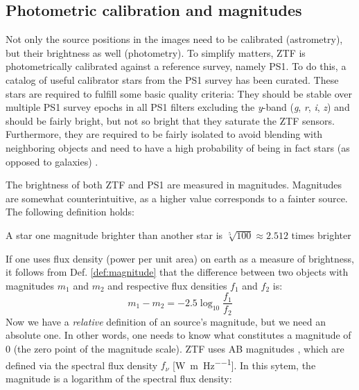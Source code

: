 \subsection{Photometric calibration and magnitudes}
Not only the source positions in the images need to be calibrated (astrometry), but their brightness as well (photometry). To simplify matters, ZTF is photometrically calibrated against a reference survey, namely PS1. To do this, a catalog of useful calibrator stars from the PS1 survey has been curated. These stars are required to fulfill some basic quality criteria: They should be stable over multiple PS1 survey epochs in all PS1 filters excluding the \textit{y}-band (\textit{g}, \textit{r}, \textit{i}, \textit{z}) and should be fairly bright, but not so bright that they saturate the ZTF sensors. Furthermore, they are required to be fairly isolated to avoid blending with neighboring objects and need to have a high probability of being in fact stars (as opposed to galaxies) \cite{Masci2019a}.

The brightness of both ZTF and PS1 are measured in magnitudes. Magnitudes are somewhat counterintuitive, as a higher value corresponds to a fainter source. The following definition holds:

\begin{definition}
A star one magnitude brighter than another star is $\sqrt[5]{100} \approx 2.512$ times brighter
\end{definition}
If one uses flux density (power per unit area) on earth as a measure of brightness, it follows from Def. \ref{def:magnitude} that the difference between two objects with magnitudes $m_1$ and $m_2$ and respective flux densities $f_1$ and $f_2$ is:
\begin{equation}
m_1 - m_2 = -2.5 \log_{10}{\frac{f_1}{f_2}}
\end{equation}
Now we have a \textit{relative} definition of an source's magnitude, but we need an absolute one. In other words, one needs to know what constitutes a magnitude of 0 (the zero point of the magnitude scale). ZTF uses AB magnitudes , which are defined via the spectral flux density $f_\nu$ [\unit{\W\per\m\per\Hz}]. In this sytem, the magnitude is a logarithm of the spectral flux density: 

